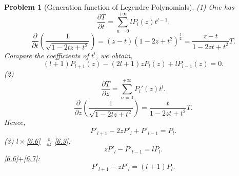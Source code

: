 \documentclass{article}
\theoremstyle{1}
\newtheorem{problem}{Problem}
\newcommand{\pa}{\partial}
\begin{document}
\begin{problem}[Generation function of Legendre Polynomials]
    (1) One has 
    \begin{equation}
        \frac{\pa T}{\pa t}=\sum_{n=0}^{+\infty}lP_l\left(z\right)t^{l-1}.
    \end{equation}
    \begin{equation}
        \frac{\pa}{\pa t}\left(\frac{1}{\sqrt{1-2tz+t^2}}\right)=\left(z-t\right)\left(1-2z+t^2\right)^{\frac{3}{2}}=\frac{z-t}{1-2zt+t^2}T.
    \end{equation}
    Compare the coefficients of $t^l$, we obtain,
    \begin{equation}\label{6.3}
        (l+1)P_{l+1}\left(z\right)-(2l+1)zP_l(z)+lP_{l-1}(z)=0.
    \end{equation}
    (2) \begin{equation}
        \frac{\pa T}{\pa z}=\sum_{n=0}^{+\infty}P_{l}'(z)t^l.
    \end{equation}
    \begin{equation}
        \frac{\pa }{\pa z}\left(\frac{1}{\sqrt{1-2tz+t^2}}\right)=\frac{t}{1-2zt+t^2}T.
    \end{equation}
    Hence,
    \begin{equation}\label{6.6}
        P'_{l+1}-2zP'_l+P'_{l-1}=P_l.
    \end{equation}
    (3) $l\times$\eqref{6.6}$-\frac{\dd}{\dd{z}}$ \eqref{6.3}:
    \begin{equation}\label{6.7}
        zP'_l-P'_{l-1}=lP_l.
    \end{equation}
    \eqref{6.6}$+$\eqref{6.7}:
    \begin{equation}
        P'_{l+1}-zP'_l=(l+1)P_l.
    \end{equation}

\end{problem}
\end{document}
